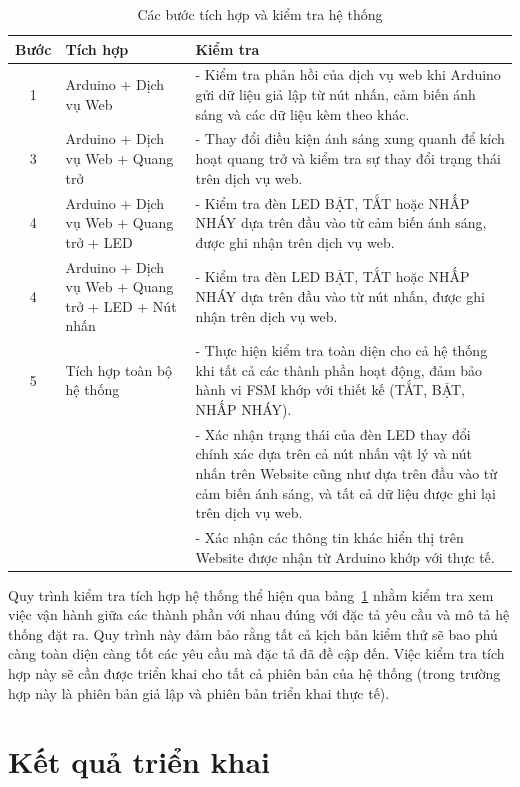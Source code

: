 {\begin{table}[h!]
\centering
\small
\begin{tabular}{|c|p{4cm}|p{8cm}|}
\hline
\textbf{Bước} & \textbf{Tích hợp} & \textbf{Kiểm tra} \\ \hline
1 & Arduino + Dịch vụ Web & - Kiểm tra phản hồi của dịch vụ web khi Arduino gửi dữ liệu giả lập từ nút nhấn, cảm biến ánh sáng và các dữ liệu kèm theo khác. \\ \hline
3 & Arduino + Dịch vụ Web + Quang trở & - Thay đổi điều kiện ánh sáng xung quanh để kích hoạt quang trở và kiểm tra sự thay đổi trạng thái trên dịch vụ web. \\ \hline
4 & Arduino + Dịch vụ Web + Quang trở + LED & - Kiểm tra đèn LED BẬT, TẮT hoặc NHẤP NHÁY dựa trên đầu vào từ cảm biến ánh sáng, được ghi nhận trên dịch vụ web. \\ \hline
4 & Arduino + Dịch vụ Web + Quang trở + LED + Nút nhấn & - Kiểm tra đèn LED BẬT, TẮT hoặc NHẤP NHÁY dựa trên đầu vào từ nút nhấn, được ghi nhận trên dịch vụ web. \\ \hline
5 & Tích hợp toàn bộ hệ thống & - Thực hiện kiểm tra toàn diện cho cả hệ thống khi tất cả các thành phần hoạt động, đảm bảo hành vi FSM khớp với thiết kế (TẮT, BẬT, NHẤP NHÁY). \\
  & & - Xác nhận trạng thái của đèn LED thay đổi chính xác dựa trên cả nút nhấn vật lý và nút nhấn trên Website cũng như dựa trên đầu vào từ cảm biến ánh sáng, và tất cả dữ liệu được ghi lại trên dịch vụ web. \\
  & & - Xác nhận các thông tin khác hiển thị trên Website được nhận từ Arduino khớp với thực tế. \\ \hline
\end{tabular}
\caption{Các bước tích hợp và kiểm tra hệ thống}
\label{tab:integration_check}
\end{table}

Quy trình kiểm tra tích hợp hệ thống thể hiện qua bảng~\ref{tab:integration_check} nhằm kiểm tra xem việc vận hành giữa các thành phần với nhau đúng với đặc tả yêu cầu và mô tả hệ thống đặt ra. Quy trình này đảm bảo rằng tất cả kịch bản kiểm thử sẽ bao phủ càng toàn diện càng tốt các yêu cầu mà đặc tả đã đề cập đến. Việc kiểm tra tích hợp này sẽ cần được triển khai cho tất cả phiên bản của hệ thống (trong trường hợp này là phiên bản giả lập và phiên bản triển khai thực tế). 


\pagebreak
\section{Kết quả triển khai}
}
